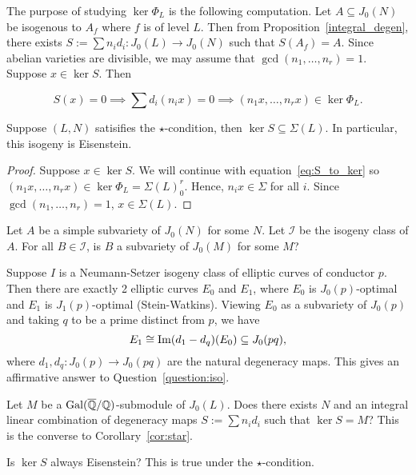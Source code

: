 \documentclass{article}
\begin{document}
The purpose of studying $\ker\Phi_L$ is the following computation. Let
$A\subseteq J_0(N)$ be isogenous to $A_f$ where $f$ is of level $L$. Then from
Proposition~\ref{integral_degen}, there exists $S:=\sum n_i d_i:J_0(L)\to
J_0(N)$ such that $S(A_f)=A$. Since abelian varieties are divisible, we may
assume that $\gcd(n_1, \ldots,n_r)=1$. Suppose $x\in \ker S$. Then 

\begin{equation}
    \label{eq:S_to_ker}
    S(x) = 0 \implies \sum d_i(n_i x) =0 \implies (n_1 x,\ldots,n_r x) \in
    \ker\Phi_L. 
\end{equation}

\begin{corollary}
    \label{cor:star}
    Suppose $(L, N)$ satisifies the $\star$-condition, then $\ker S\subseteq
    \Sigma(L)$. In particular, this isogeny is Eisenstein.
\end{corollary}
\begin{proof}
    Suppose $x\in \ker S$. We will continue with equation~\eqref{eq:S_to_ker}
    so $(n_1 x, \ldots, n_r x)\in \ker\Phi_L = \Sigma(L)_0 ^r$. Hence, $n_i x\in
    \Sigma$ for all $i$. Since $\gcd(n_1,\ldots,n_r)=1$, $x\in \Sigma(L)$.
\end{proof}

\begin{question}
    \label{question:iso}
    Let $A$ be a simple subvariety of $J_0(N)$ for some $N$. Let $\mathcal{I}$
    be the isogeny class of $A$. For all $B\in \mathcal{I}$, is $B$ a
    subvariety of $J_0(M)$ for some $M$?
\end{question}

\begin{example}
    Suppose $I$ is a Neumann-Setzer isogeny class of elliptic curves of
    conductor $p$. Then there are exactly 2 elliptic curves $E_0$ and $E_1$,
    where $E_0$ is $J_0(p)$-optimal and $E_1$ is $J_1(p)$-optimal
    (Stein-Watkins). Viewing $E_0$ as a subvariety of $J_0(p)$ and taking $q$
    to be a prime distinct from $p$, we have
    \[
        E_1 \cong \operatorname{Im} (d_1-d_q)(E_0)\subseteq J_0(pq),
    \]
    where $d_1, d_q:J_0(p)\to J_0(pq)$ are the natural degeneracy maps. This
    gives an affirmative answer to Question~\ref{question:iso}.
\end{example}


\begin{question}
    Let $M$ be a $\operatorname{Gal}(\overline{\mathbb{Q}}/\mathbb{Q})$-submodule of $J_0(L)$. Does there exists
    $N$ and an integral linear combination of degeneracy maps $S:=\sum n_i d_i$
    such that $\ker S=M$? This is the converse to Corollary~\ref{cor:star}.
\end{question}

\begin{question}
    Is $\ker S$ always Eisenstein? This is true under the $\star$-condition.
\end{question}
\end{document}

